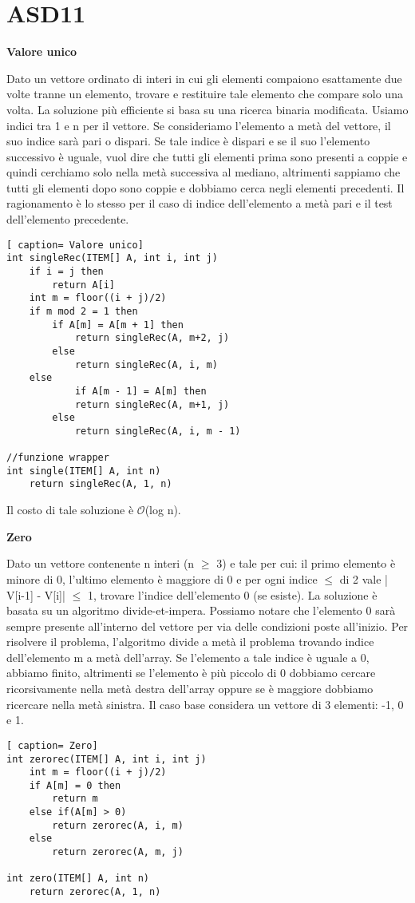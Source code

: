 \documentclass[../cheatSheetAlgoritmi.tex]{subfiles}
\begin{document}
\section{ASD11}
\textbf{Valore unico}

Dato un vettore ordinato di interi in cui gli elementi compaiono esattamente due volte tranne un elemento, trovare e restituire tale elemento che compare solo una volta. La soluzione più efficiente si basa su una ricerca binaria modificata. Usiamo indici tra 1 e n per il vettore. Se consideriamo l'elemento a metà del vettore, il suo indice sarà pari o dispari. Se tale indice è dispari e se il suo l'elemento successivo è uguale, vuol dire che tutti gli elementi prima sono presenti a coppie e quindi cerchiamo solo nella  metà successiva al mediano, altrimenti sappiamo che tutti gli elementi dopo sono coppie e dobbiamo cerca negli elementi precedenti. Il ragionamento è lo stesso per il caso di indice dell'elemento a metà pari e il test dell'elemento precedente.
\newpage
\begin{lstlisting}[ caption= Valore unico]
int singleRec(ITEM[] A, int i, int j)
	if i = j then
		return A[i]
	int m = floor((i + j)/2)
	if m mod 2 = 1 then
		if A[m] = A[m + 1] then
			return singleRec(A, m+2, j)
		else
			return singleRec(A, i, m)
	else
			if A[m - 1] = A[m] then
			return singleRec(A, m+1, j)
		else
			return singleRec(A, i, m - 1)
			
//funzione wrapper
int single(ITEM[] A, int n)
	return singleRec(A, 1, n)
\end{lstlisting}
Il costo di tale soluzione è $\mathcal{O}$(log n).

\bigskip

\textbf{Zero}

Dato un vettore contenente n interi (n $\geq$ 3) e tale per cui: il primo elemento è minore di 0, l'ultimo elemento è maggiore di 0 e per ogni indice $\leq$ di 2 vale | V[i-1] - V[i]| $\leq$ 1, trovare l'indice dell'elemento 0 (se esiste). La soluzione è basata su un algoritmo divide-et-impera. Possiamo notare che l'elemento 0 sarà sempre presente all'interno del vettore per via delle condizioni poste all'inizio. Per risolvere il problema, l'algoritmo divide a metà il problema trovando indice dell'elemento m a metà dell'array. Se l'elemento a tale indice è uguale a 0, abbiamo finito, altrimenti se l'elemento è più piccolo di 0 dobbiamo cercare ricorsivamente nella metà destra dell'array oppure se è maggiore dobbiamo ricercare nella metà sinistra. Il caso base considera un vettore di 3 elementi: -1, 0 e 1.
 
\begin{lstlisting}[ caption= Zero]
int zerorec(ITEM[] A, int i, int j)
	int m = floor((i + j)/2)
	if A[m] = 0 then
		return m
	else if(A[m] > 0)
		return zerorec(A, i, m)
	else
		return zerorec(A, m, j)
			
int zero(ITEM[] A, int n)
	return zerorec(A, 1, n)
\end{lstlisting}

\newpage
\end{document}
